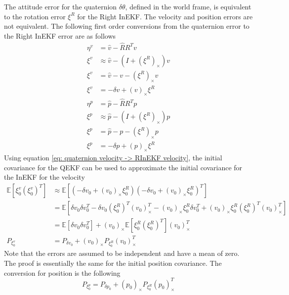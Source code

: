 The attitude error for the quaternion $\delta \theta$, defined in the world frame, is equivalent to the rotation error $\xi^R$ for the Right InEKF. The velocity and position errors are not equivalent. The following first order conversions from the quaternion error to the Right InEKF error are as follows \cite{Contact-Aided_Invarant_EKF}
\begin{equation}
    \begin{split}
        \eta^v &= \hat{v} - \hat{R} R^T v \\
        \xi^v &\approx \hat{v} - (I + (\xi^R)_{\times}) v \\
        \xi^v &= \hat{v} - v - (\xi^R)_{\times} v \\
        \xi^v &= -\delta v + (v)_{\times} \xi^R
    \end{split}
    \label{eq: quaternion velocity -> RInEKF velocity}
\end{equation}
\begin{equation}
    \begin{split}
        \eta^p &= \hat{p} - \hat{R} R^T p \\
        \xi^p &\approx \hat{p} - (I + (\xi^R)_{\times}) p \\
        \xi^p &= \hat{p} - p - (\xi^R)_{\times} p \\
        \xi^p &= -\delta p + (p)_{\times} \xi^R
    \end{split}
    \label{eq: quaternion position -> RInEKF position}
\end{equation}
Using equation \eqref{eq: quaternion velocity -> RInEKF velocity}, the initial covariance for the QEKF can be used to approximate the initial covariance for the InEKF for the velocity
\begin{equation}
    \begin{split}
        \mathbb{E}[\xi_0^v (\xi_0^v)^T] &\approx \mathbb{E}[( -\delta v_0 + (v_0)_{\times} \xi_0^R) ( -\delta v_0 + (v_0)_{\times} \xi_0^R)^T]\\ 
        &= \mathbb{E}[\delta v_0 \delta v_0^T - 
            \delta v_0 (\xi_0^R)^T (v_0)_{\times}^T  -
            (v_0)_{\times} \xi_0^R \delta v_0^T +
            (v_0)_{\times} \xi_0^R (\xi_0^R)^T (v_0)_{\times}^T
            ]\\
        &= \mathbb{E}[\delta v_0 \delta v_0^T] 
            + (v_0)_{\times} \mathbb{E}[\xi_0^R (\xi_0^R)^T] (v_0)_{\times}^T \\
        P_{\xi^v_0} &= P_{\delta v_0} + (v_0)_{\times} P_{\xi^R_0} (v_0)_{\times}^T
        \label{eq: v initial covariance InEKF}
    \end{split}
\end{equation}
Note that the errors are assumed to be independent and have a mean of zero. The proof is essentially the same for the initial position covariance. The conversion for position is the following
\begin{equation}
    P_{\xi^p_0} = P_{\delta p_0} + (p_0)_{\times} P_{\xi^R_0} (p_0)_{\times}^T
    \label{eq: p initial covariance InEKF}
\end{equation}


